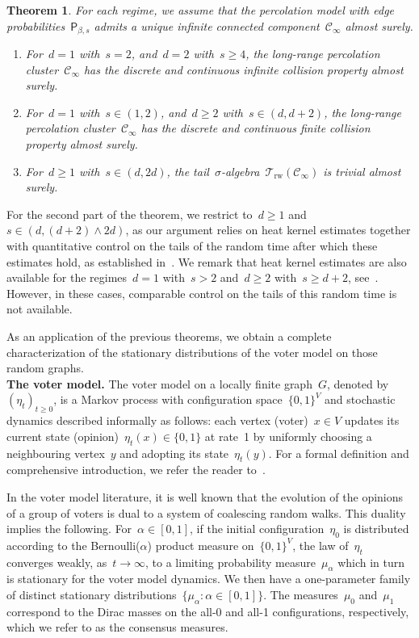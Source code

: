 \documentclass[a4paper,11pt]{article}
\newtheorem{theorem}{Theorem}
\theoremstyle{definition}
\begin{document}
\begin{theorem}\label{thm:long_range_cluster}
For each regime, we assume that the percolation model with edge probabilities~$\mathsf P_{\beta,s}$ admits a unique infinite connected component~$\mathcal C_\infty$ almost surely.
\begin{enumerate}
    \item For~$d = 1$ with~$s =2$, and~$d=2$ with~$s \ge 4$, the long-range percolation cluster~$\mathcal C_\infty$ has the discrete and continuous infinite collision property almost surely.
    \item For~$d = 1$ with~$s \in (1,2)$, and~$d \ge 2$ with~$s \in (d,d+2)$, the long-range percolation cluster~$\mathcal C_\infty$ has the discrete and continuous finite collision property almost surely.
    \item \cite{BenjaminiCurien2012} For~$d \ge 1$ with~$s \in (d,2d)$, the tail~$\sigma$-algebra~$\mathcal T_\mathrm{rw}(\mathcal C_\infty)$ is trivial almost surely.
\end{enumerate}
\end{theorem}
For the second part of the theorem, we restrict to~$d \ge 1$ and~$s \in (d,(d+2)\wedge 2d)$, as our argument relies on heat kernel estimates together with quantitative control on the tails of the random time after which these estimates hold, as established in~\cite{Sly12}. We remark that heat kernel estimates are also available for the regimes~$d=1$ with~$s>2$ and~$d\ge2$ with~$s\ge d+2$, see~\cite{CanCroydonKumagai2022}. However, in these cases, comparable control on the tails of this random time is not available.

As an application of the previous theorems, we obtain a complete characterization of the stationary distributions of the voter model on those random graphs. \\

\noindent \textbf{The voter model.} The voter model on a locally finite graph~$G$, denoted by~$(\eta_t)_{t \ge 0}$, is a Markov process with configuration space~$\{0,1\}^V$ and stochastic dynamics described informally as follows: each vertex (voter)~$x \in V$ updates its current state (opinion)~$\eta_t(x) \in \{0,1\}$ at rate~1 by uniformly choosing a neighbouring vertex~$y$ and adopting its state~$\eta_t(y)$. For a formal definition and comprehensive introduction, we refer the reader to~\cite{Liggett85,Swart2026}.  

In the voter model literature, it is well known that the evolution of the opinions of a group of voters is dual to a system of coalescing random walks. This duality implies the following. For~$\alpha \in [0,1]$, if the initial configuration~$\eta_0$ is distributed according to the Bernoulli($\alpha$) product measure on~$\{0,1\}^V$, the law of~$\eta_t$ converges weakly, as~$t \to \infty$, to a limiting probability measure~$\mu_\alpha$ which in turn is stationary for the voter model dynamics. We then have a one-parameter family of distinct stationary distributions~$\{\mu_\alpha: \alpha \in [0,1]\}$. The measures~$\mu_0$ and~$\mu_1$ correspond to the Dirac masses on the all-0 and all-1 configurations, respectively, which we refer to as the consensus measures. 
\end{document}
